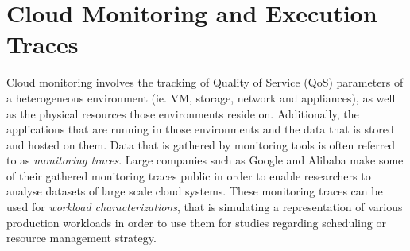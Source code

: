 






    \section{Cloud Monitoring and Execution Traces}
    \label{sec:public-cloud-provider-traces-in-available-data-related-work}

        Cloud monitoring involves the tracking of Quality of Service (QoS) parameters of a heterogeneous environment (ie. VM, storage, network and appliances), as well as the physical resources those environments reside on. Additionally, the applications that are running in those environments and the data that is stored and hosted on them.
        Data that is gathered by monitoring tools is often referred to as \emph{monitoring traces}.
        Large companies such as Google and Alibaba make some of their gathered monitoring traces public in order to enable researchers to analyse datasets of large scale cloud systems.
        These monitoring traces can be used for \emph{workload characterizations}, that is simulating a representation of various production workloads in order to use them for studies regarding scheduling or resource management strategy.

